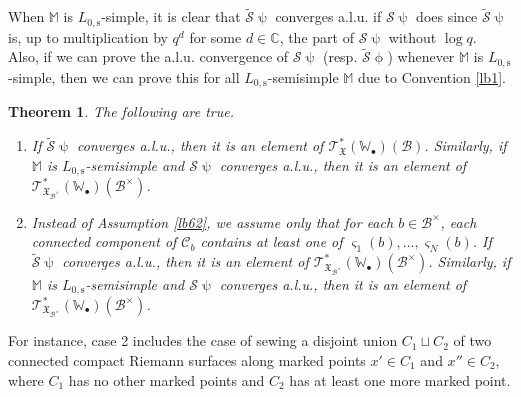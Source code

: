 \documentclass[12pt,a4paper,notitlepage]{article}
\theoremstyle{definition}
\theoremstyle{plain}
\newtheorem{thm}[df]{Theorem}
\newcommand{\fk}{\mathfrak}
\newcommand{\mc}{\mathcal}
\newcommand{\wtd}{\widetilde}
\newcommand{\scr}{\mathscr}
\newcommand{\sgm}{\varsigma}
\newcommand{\blt}{\bullet}
\newcommand{\Wbb}{\mathbb W}
\newcommand{\Mbb}{\mathbb M}
\newcommand{\Cbb}{\mathbb C}
\newcommand{\Lss}{{L_{0,\mathrm{s}}}}
\numberwithin{equation}{section}
\begin{document}
When $\Mbb$ is $\Lss$-simple, it is clear that $\wtd{\mc S}\uppsi$ converges a.l.u. if  $\mc S\uppsi$ does since $\wtd{\mc S}\uppsi$ is, up to multiplication by $q^d$ for some $d\in\Cbb$, the part of $\mc S\uppsi$ without $\log q$. Also, if we can prove the a.l.u. convergence of $\mc S\uppsi$ (resp. $\wtd{\mc S}\upphi$) whenever $\Mbb$ is $\Lss$-simple, then we can prove this for all $\Lss$-semisimple $\Mbb$ due to Convention \ref{lb1}.


\begin{thm}\label{lb47}
The following are true.
\begin{enumerate}
\item  If  $\wtd{\mc S}\uppsi$  converges a.l.u., then it is an element  of $\scr T_{\fk X}^*(\Wbb_\blt)(\mc B)$. Similarly, if $\Mbb$ is $\Lss$-semisimple and $\mc S\uppsi$ converges a.l.u., then it is an element of $\scr T_{\fk X_{\mc B^\times}}^*(\Wbb_\blt)(\mc B^\times)$.
\item Instead of Assumption \ref{lb62}, we assume only that for each $b\in\mc B^\times$, each connected component of $\mc C_b$ contains at least one of $\sgm_1(b),\dots,\sgm_N(b)$. If  $\wtd{\mc S}\uppsi$  converges a.l.u., then it is an element  of $\scr T_{\fk X_{\mc B^\times}}^*(\Wbb_\blt)(\mc B^\times)$. Similarly, if $\Mbb$ is $\Lss$-semisimple and $\mc S\uppsi$ converges a.l.u., then it is an element of $\scr T_{\fk X_{\mc B^\times}}^*(\Wbb_\blt)(\mc B^\times)$.
\end{enumerate}
\end{thm}




For instance, case 2 includes the case of sewing a disjoint union $C_1\sqcup C_2$ of two connected compact Riemann surfaces along marked points $x'\in C_1$ and $x''\in C_2$, where $C_1$ has no other marked points and $C_2$ has at least one more marked point. 
\end{document}
